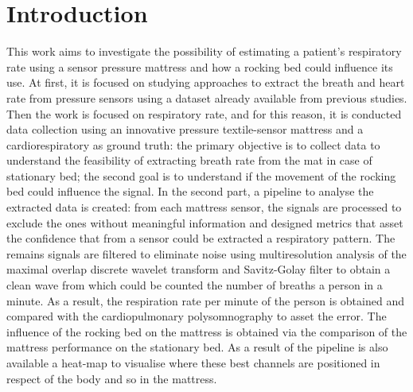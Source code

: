 
\chapter{Introduction}



This work aims to investigate the possibility of estimating a patient's respiratory rate using a sensor pressure mattress and how a rocking bed could influence its use. 
At first, it is focused on studying approaches to extract the breath and heart rate from pressure sensors using a dataset already available from previous studies. 
Then the work is focused on respiratory rate, and for this reason, it is conducted data collection using an innovative pressure textile-sensor mattress and a cardiorespiratory as ground truth: the primary objective is to collect data to understand the feasibility of extracting breath rate from the mat in case of stationary bed; the second goal is to understand if the movement of the rocking bed could influence the signal. 
In the second part, a pipeline to analyse the extracted data is created: from each mattress sensor, the signals are processed to exclude the ones without meaningful information and designed metrics that asset the confidence that from a sensor could be extracted a respiratory pattern. The remains signals are filtered to eliminate noise using multiresolution analysis of the maximal overlap discrete wavelet transform and Savitz-Golay filter to obtain a clean wave from which could be counted the number of breaths a person in a minute. As a result, the respiration rate per minute of the person is obtained and compared with the cardiopulmonary polysomnography to asset the error. The influence of the rocking bed on the mattress is obtained via the comparison of the mattress performance on the stationary bed. As a result of the pipeline is also available a heat-map to visualise where these best channels are positioned in respect of the body and so in the mattress.


\newpage


